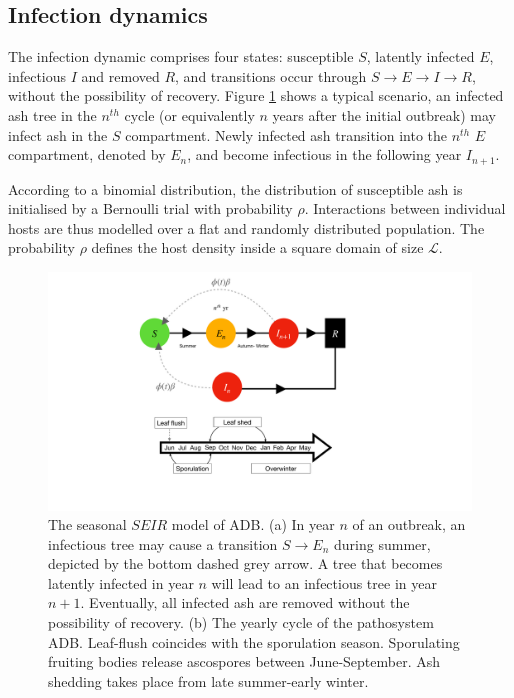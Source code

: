 \subsection{Infection dynamics}
\label{sec:infection-dynamics}

The infection dynamic comprises four states: susceptible $S$, latently infected $E$, infectious $I$ and removed $R$, and transitions occur through $S\rightarrow E \rightarrow I \rightarrow R$, without the possibility of recovery. Figure \ref{fig:SEIR-transitions} shows a typical scenario, an infected ash tree in the $n^{th}$ cycle (or equivalently $n$ years after the initial outbreak) may infect ash in the $S$ compartment. 
Newly infected ash transition into the $n^{th}$ $E$ compartment, denoted by $E_n$, and become infectious in the following year $I_{n+1}$.

According to a binomial distribution, the distribution of susceptible ash is initialised by a Bernoulli trial with probability $\rho$.
Interactions between individual hosts are thus modelled over a flat and randomly distributed population.
The probability $\rho$ defines the host density inside a square domain of size $\mathcal{L}$. 

\begin{figure}
    \centering
    \includegraphics[scale=0.40]{chapter6/figures/fig1-seir-transitions.pdf}
    \caption{The seasonal $SEIR$ model of ADB. (a) In year $n$ of an outbreak, an infectious tree may cause a transition $S\rightarrow E_n$ during summer, depicted by the bottom dashed grey arrow. A tree that becomes latently infected in year $n$ will lead to an infectious tree in year $n+1$. Eventually, all infected ash are removed without the possibility of recovery. (b) The yearly cycle of the pathosystem ADB. Leaf-flush coincides with the sporulation season. Sporulating fruiting bodies release ascospores between June-September. Ash shedding takes place from late summer-early winter. }
    \label{fig:SEIR-transitions}
\end{figure}

